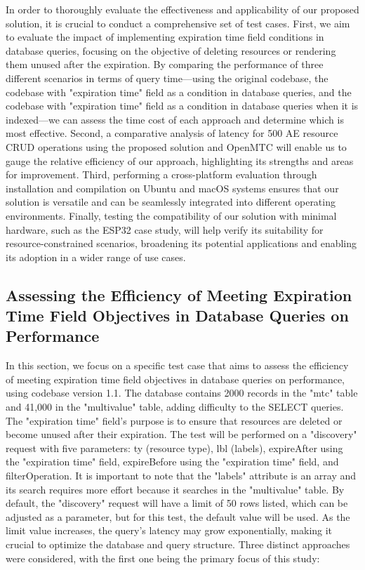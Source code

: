 \documentclass[a4paper,fleqn]{cas-dc}
\begin{document}
In order to thoroughly evaluate the effectiveness and applicability of our proposed solution, it is crucial to conduct a comprehensive set of test cases. First, we aim to evaluate the impact of implementing expiration time field conditions in database queries, focusing on the objective of deleting resources or rendering them unused after the expiration. By comparing the performance of three different scenarios in terms of query time—using the original codebase, the codebase with "expiration time" field as a condition in database queries, and the codebase with "expiration time" field as a condition in database queries when it is indexed—we can assess the time cost of each approach and determine which is most effective. Second, a comparative analysis of latency for 500 AE resource CRUD operations using the proposed solution and OpenMTC will enable us to gauge the relative efficiency of our approach, highlighting its strengths and areas for improvement. Third, performing a cross-platform evaluation through installation and compilation on Ubuntu and macOS systems ensures that our solution is versatile and can be seamlessly integrated into different operating environments. Finally, testing the compatibility of our solution with minimal hardware, such as the ESP32 case study, will help verify its suitability for resource-constrained scenarios, broadening its potential applications and enabling its adoption in a wider range of use cases.

\subsection{Assessing the Efficiency of Meeting Expiration Time Field Objectives in Database Queries on Performance}

In this section, we focus on a specific test case that aims to assess the efficiency of meeting expiration time field objectives in database queries on performance, using codebase version 1.1. The database contains 2000 records in the "mtc" table and 41,000 in the "multivalue" table, adding difficulty to the SELECT queries. The "expiration time" field's purpose is to ensure that resources are deleted or become unused after their expiration. The test will be performed on a "discovery" request with five parameters: ty (resource type), lbl (labels), expireAfter using the "expiration time" field, expireBefore using the "expiration time" field, and filterOperation. It is important to note that the "labels" attribute is an array and its search requires more effort because it searches in the "multivalue" table. By default, the "discovery" request will have a limit of 50 rows listed, which can be adjusted as a parameter, but for this test, the default value will be used. As the limit value increases, the query's latency may grow exponentially, making it crucial to optimize the database and query structure. Three distinct approaches were considered, with the first one being the primary focus of this study:
\end{document}

